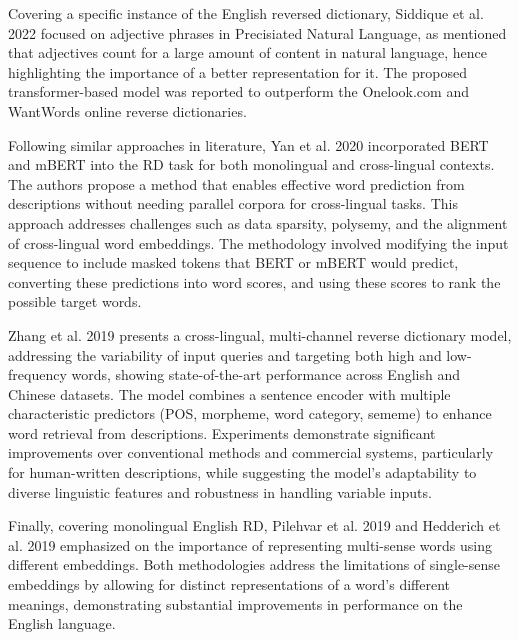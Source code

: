 \documentclass[12.5pt]{article}
\begin{document}
Covering a specific instance of the English reversed dictionary, Siddique et al. 2022 \cite{Siddique2022} focused on adjective phrases in Precisiated Natural Language, as mentioned that adjectives count for a large amount of content in natural language, hence highlighting the importance of a better representation for it. The proposed transformer-based model was reported to outperform the Onelook.com and WantWords online reverse dictionaries.

Following similar approaches in literature, Yan et al. 2020 \cite{Yan2020} incorporated BERT and mBERT into the RD task for both monolingual and cross-lingual contexts. The authors propose a method that enables effective word prediction from descriptions without needing parallel corpora for cross-lingual tasks. This approach addresses challenges such as data sparsity, polysemy, and the alignment of cross-lingual word embeddings. The methodology involved modifying the input sequence to include masked tokens that BERT or mBERT would predict, converting these predictions into word scores, and using these scores to rank the possible target words.

Zhang et al. 2019 \cite{Zhang2019} presents a cross-lingual, multi-channel reverse dictionary model, addressing the variability of input queries and targeting both high and low-frequency words, showing state-of-the-art performance across English and Chinese datasets. The model combines a sentence encoder with multiple characteristic predictors (POS, morpheme, word category, sememe) to enhance word retrieval from descriptions. Experiments demonstrate significant improvements over conventional methods and commercial systems, particularly for human-written descriptions, while suggesting the model's adaptability to diverse linguistic features and robustness in handling variable inputs.

Finally, covering monolingual English RD, Pilehvar et al. 2019 \cite{Pilehvar2019} and Hedderich et al. 2019 \cite{Hedderich2019} emphasized on the importance of representing multi-sense words using different embeddings. Both methodologies address the limitations of single-sense embeddings by allowing for distinct representations of a word's different meanings, demonstrating substantial improvements in performance on the English language.
\end{document}
